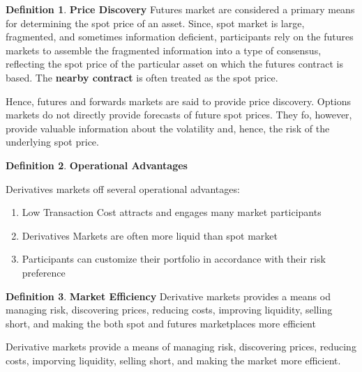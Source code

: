 \documentclass{book}
\theoremstyle{definition}
\newtheorem{definition}{Definition}[section]
\theoremstyle{remark}
\begin{document}
        \begin{definition}{\textbf{Price Discovery}}
            Futures market are considered a primary means for determining the spot price of an asset. Since, spot market is large, fragmented, and sometimes information deficient, participants rely on the futures markets to assemble the fragmented information into a type of consensus, reflecting the spot price of the particular asset on which the futures contract is based. The \textbf{nearby contract} is often treated as the spot price.
            
            Hence, futures and forwards markets are said to provide price discovery. Options markets do not directly provide forecasts of future spot prices. They fo, however, provide valuable information about the volatility and, hence, the risk of the underlying spot price. 
        \end{definition}
        
        \begin{definition}{\textbf{Operational Advantages}}
            
            Derivatives markets off several operational advantages:
                \begin{enumerate}
                    \item Low Transaction Cost attracts and engages many market participants
                    
                    \item Derivatives Markets are often more liquid than spot market
                    
                    \item Participants can customize their portfolio in accordance with their risk preference
                \end{enumerate}
        \end{definition}
        
        \begin{definition}{\textbf{Market Efficiency}}
            Derivative markets provides a means od managing risk, discovering prices, reducing costs, improving liquidity, selling short, and making the both spot and futures marketplaces more efficient
        \end{definition}
        
        \begin{tcolorbox}[colback=blue!5!white,colframe=blue!75!black, title=Sticky Note]
            Derivative markets provide a means of managing risk, discovering prices, reducing costs, imporving liquidity, selling short, and making the market more efficient. 
        \end{tcolorbox}        
\end{document}
